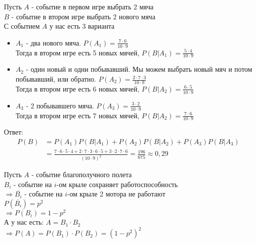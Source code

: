\begin{exercise}[2]
	Пусть $A$ - событие в первом игре выбрать 2 мяча \\ $B$ - событие в втором игре выбрать 2 нового мяча \\ С событием $A$ у нас есть 3 варианта
	\begin{itemize}
		\item $A_1$ - два нового мяча. $P(A_1) = \frac{7 \cdot 6}{10 \cdot 9}$ \\ Тогда в втором игре есть 5 новых мячей, $P(B | A_1) = \frac{5 \cdot 4}{10 \cdot 9}$
		\item $A_2$ - один новый и одни побывавший. Мы можем выбрать новый мяч и потом побывавший, или обратно. $P(A_2) = \frac{2 \cdot 7 \cdot 3}{10 \cdot 9}$ \\ Тогда в втором игре есть 6 новых мячей, $P(B | A_2) = \frac{6 \cdot 5}{10 \cdot 9}$ 
		\item $A_3$ - 2 побывавшего мяча. $P(A_3) = \frac{3 \cdot 2}{10 \cdot 9}$ \\ Тогда в втором игре есть 7 новых мячей, $P(B | A_2) = \frac{7 \cdot 6}{10 \cdot 9}$
	\end{itemize}
	Ответ:
	\begin{align*}
		P(B) &= P(A_1) P(B | A_1) + P(A_2) P(B | A_2) + P(A_3) P(B | A_3) \\ &= \frac{7 \cdot 6 \cdot 5 \cdot 4 + 2 \cdot 7 \cdot 3 \cdot 6 \cdot 5 + 3 \cdot 2 \cdot 7 \cdot 6}{(10 \cdot 9)^2} = \frac{196}{675} \approx 0,29
	\end{align*}
\end{exercise}

\begin{exercise}[3]
	Пусть $A$ - событие благополучного полета \\ $B_i$ - событие на $i$-ом крыле сохраняет работоспособность \\ $\Rightarrow \overline{B_i}$ - событие на $i$-ом крыле 2 мотора не работают \\ $P(\overline{B_i}) = p^2$ \\ $\Rightarrow P(B_i) = 1-p^2$ \\ А у нас есть: $A = B_1 \cdot B_2$ \\ $\Rightarrow P(A) = P(B_1) \cdot P(B_2) = (1-p^2)^2$
\end{exercise}

